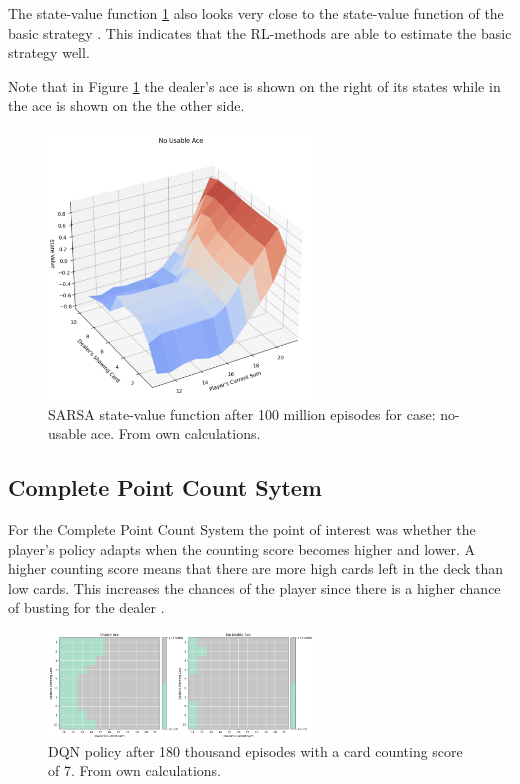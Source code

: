 \documentclass[conference]{IEEEtran}
\begin{document}
The state-value function \ref{fig:sarsa-state-value-basic} also looks very close to the state-value function of the basic strategy \cite{b4}.
This indicates that the RL-methods are able to estimate the basic strategy well. 

Note that in Figure \ref{fig:sarsa-state-value-basic} the dealer's ace is shown on the right of its states while in \cite{b4} the ace is shown on the the other side. 

\begin{figure}
	\centering
	\includegraphics[width=70mm]{figures/MC/basic-100-million/value-function-no-usuable-ace.png}
	\caption{SARSA state-value function after 100 million episodes for case: no-usable ace. From own calculations.}
	\label{fig:sarsa-state-value-basic}
\end{figure}

\subsection{Complete Point Count Sytem}
For the Complete Point Count System the point of interest was whether the player's policy adapts when the counting score becomes higher and lower. 
A higher counting score means that there are more high cards left in the deck than low cards.
This increases the chances of the player since there is a higher chance of busting for the dealer \cite{b1}.  

\begin{figure}
	\centering
	\includegraphics[width=70mm]{figures/DQN/counting-180000/policy-counting-7.png}
	\caption{DQN policy after 180 thousand episodes with a card counting score of 7. From own calculations.}
	\label{fig:dqn-card-counting-7}
\end{figure}
\end{document}
